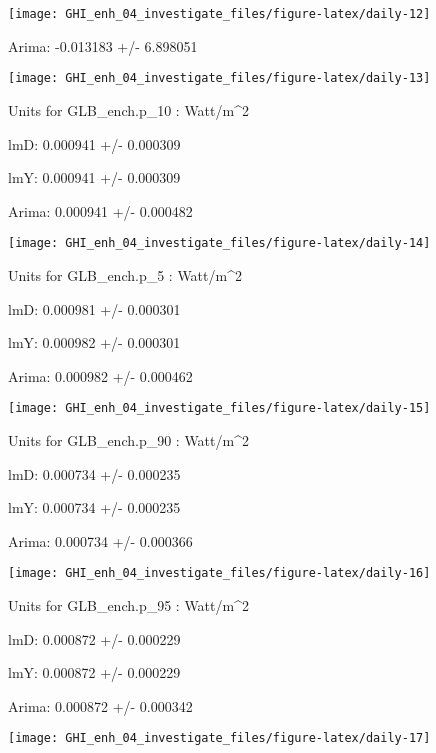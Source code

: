\documentclass[
  10pt,
  a4paper,oneside]{article}
\begin{document}
\begin{center}\texttt{[image: GHI\_enh\_04\_investigate\_files/figure-latex/daily-12]} \end{center}

Arima: -0.013183 +/- 6.898051

\begin{center}\texttt{[image: GHI\_enh\_04\_investigate\_files/figure-latex/daily-13]} \end{center}

Units for GLB\_ench.p\_10 : Watt/m\^{}2

lmD: 0.000941 +/- 0.000309

lmY: 0.000941 +/- 0.000309

Arima: 0.000941 +/- 0.000482

\begin{center}\texttt{[image: GHI\_enh\_04\_investigate\_files/figure-latex/daily-14]} \end{center}

Units for GLB\_ench.p\_5 : Watt/m\^{}2

lmD: 0.000981 +/- 0.000301

lmY: 0.000982 +/- 0.000301

Arima: 0.000982 +/- 0.000462

\begin{center}\texttt{[image: GHI\_enh\_04\_investigate\_files/figure-latex/daily-15]} \end{center}

Units for GLB\_ench.p\_90 : Watt/m\^{}2

lmD: 0.000734 +/- 0.000235

lmY: 0.000734 +/- 0.000235

Arima: 0.000734 +/- 0.000366

\begin{center}\texttt{[image: GHI\_enh\_04\_investigate\_files/figure-latex/daily-16]} \end{center}

Units for GLB\_ench.p\_95 : Watt/m\^{}2

lmD: 0.000872 +/- 0.000229

lmY: 0.000872 +/- 0.000229

Arima: 0.000872 +/- 0.000342

\begin{center}\texttt{[image: GHI\_enh\_04\_investigate\_files/figure-latex/daily-17]} \end{center}
\end{document}
